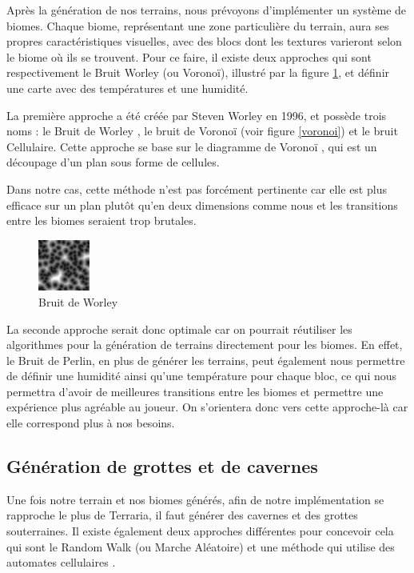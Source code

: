 \documentclass[12pt]{article}
\begin{document}
Après la génération de nos terrains, nous prévoyons d'implémenter un système de biomes. Chaque biome, représentant une zone particulière du terrain, aura ses propres caractéristiques visuelles, avec des blocs dont les textures varieront selon le biome où ils se trouvent. Pour ce faire, il existe deux approches qui sont respectivement le Bruit Worley (ou Voronoï), illustré par la figure \ref{worley}, et définir une carte avec des températures et une humidité.\par
La première approche a été créée par Steven Worley en 1996, et possède trois noms : le Bruit de Worley \cite{worley_noise}, le bruit de Voronoï (voir figure \ref{voronoi}) et le bruit Cellulaire. Cette approche se base sur le diagramme de Voronoï \cite{voronoi_diagram}, qui est un découpage d'un plan sous forme de cellules.\par



Dans notre cas, cette méthode n'est pas forcément pertinente car elle est plus efficace sur un plan plutôt qu'en deux dimensions comme nous et les transitions entre les biomes seraient trop brutales.\par
\begin{figure}
  \centering
  \includegraphics[width=0.15\textwidth]{assets/Worley.jpg}
  \caption{Bruit de Worley}
  \label{worley}
\end{figure}

La seconde approche serait donc optimale car on pourrait réutiliser les algorithmes pour la génération de terrains directement pour les biomes. En effet, le Bruit de Perlin, en plus de générer les terrains, peut également nous permettre de définir une humidité ainsi qu'une température pour chaque bloc, ce qui nous permettra d'avoir de meilleures transitions entre les biomes et permettre une expérience plus agréable au joueur. On s'orientera donc vers cette approche-là car elle correspond plus à nos besoins.
\par

\vspace{1cm}
\subsection{Génération de grottes et de cavernes}
Une fois notre terrain et nos biomes générés, afin de notre implémentation se rapproche le plus de Terraria, il faut générer des cavernes et des grottes souterraines. Il existe également deux approches différentes pour concevoir cela qui sont le Random Walk \cite{random_walk} (ou Marche Aléatoire) et une méthode qui utilise des automates cellulaires \cite{automate_cellulaire}.\par
\end{document}
